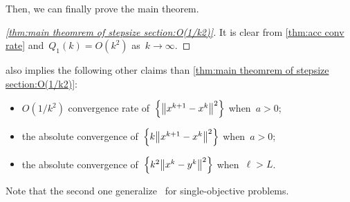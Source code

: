 \documentclass[../main]{subfiles}
\begin{document}
Then, we can finally prove the main theorem.
\begin{proof}[\cref{thm:main theomrem of stepsize section:O(1/k2)}]
    It is clear from \cref{thm:acc conv rate} and~$Q_1(k) = O(k^2)$ as~$k \to \infty$.
\end{proof}
\begin{remark}
     also implies the following other claims than \cref{thm:main theomrem of stepsize section:O(1/k2)}:
    \begin{itemize}
        \item $O(1 / k^2)$ convergence rate of~$\set*{\norm*{x^{k + 1} - x^k}^2}$ when~$a > 0$;
        \item the absolute convergence of~$\set*{k \norm*{x^{k + 1} - x^k}^2}$ when~$a > 0$;
        \item the absolute convergence of~$\set*{k^2 \norm*{x^k - y^k}^2}$ when~$\ell > L$.
    \end{itemize}
    Note that the second one generalize~\cite[Corollary~3.2]{Chambolle2015} for single-objective problems. 
\end{remark}
\end{document}
